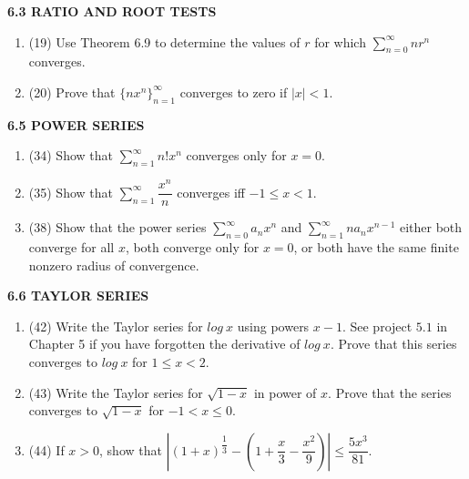\documentclass[fleqn]{article}
\begin{document}
  \textbf{6.3 RATIO AND ROOT TESTS}
  \begin{enumerate}
    \item (19) Use Theorem 6.9 to determine the values of $r$ for which $\sum\limits_{n=0}^{\infty} n r^n$ converges.

          

    \item (20) Prove that $\{ n x^n\}_{n=1}^{\infty}$ converges to zero if $|x| < 1$.

          

  \end{enumerate}


  \textbf{6.5 POWER SERIES}
  \begin{enumerate}
    \item (34) Show that $\sum\limits_{n=1}^{\infty} n! x^n$ converges only for $x=0$.

          

    \item (35) Show that $\sum\limits_{n=1}^{\infty} \dfrac{x^n}{n}$ converges iff $-1 \leq x <1$.

          

    \item (38) Show that the power series $\sum\limits_{n=0}^{\infty} a_n x^n$ and $\sum\limits_{n=1}^{\infty} n a_n x^{n-1}$ either both converge for all 
    $x$, both converge only for $x=0$, or both have the same finite nonzero radius of convergence.

          

  \end{enumerate}


  \textbf{6.6 TAYLOR SERIES}
  \begin{enumerate}
    \item (42) Write the Taylor series for $log ~ x$ using powers $x-1$. See project $5.1$ in Chapter 5 if
    you have forgotten the derivative of $log ~ x$. Prove that this series converges to $log ~ x$ for $1 \leq x <2$.

          

    \item (43) Write the Taylor series for $\sqrt{1-x}$ in power of $x$. Prove that the series converges to $\sqrt{1-x}$ for
    $-1 < x \leq 0$.

          

    \item (44) If $x > 0$, show that $|\left(1+x\right)^{\dfrac{1}{3}}-\left(1+\dfrac{x}{3}-\dfrac{x^2}{9}\right)| \leq \dfrac{5x^3}{81}$.

          

  \end{enumerate}
\end{document}
